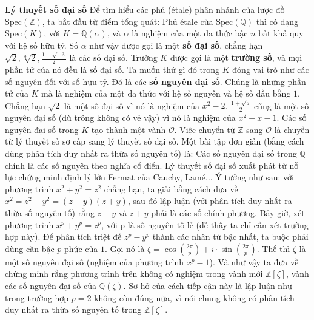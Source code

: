\begin{multicols}{2}
	\vskip 0.1cm
	\textbf{\color{duongvaotoanhoc}Lý thuyết số đại số}
	\vskip 0.1cm
	Để tìm hiểu các phủ (étale) phân nhánh của lược đồ $\text{Spec}(\mathbb{Z})$, ta bắt đầu từ điểm tổng quát: Phủ étale của $\text{Spec}(\mathbb{Q})$ thì có dạng $\text{Spec}(K)$, với $K = \mathbb{Q}(\alpha)$, và $\alpha$ là nghiệm của một đa thức bậc $n$ bất khả quy với hệ số hữu tỷ. Số $\alpha$ như vậy được gọi là một {\bf\color{duongvaotoanhoc} số đại số}, chẳng hạn $\sqrt{2}, \sqrt[3]{2}, \frac{1 + \sqrt{-3}}{2}$ là các số đại số. Trường $K$ được gọi là một {\bf\color{duongvaotoanhoc} trường số}, và mọi phần tử của nó đều là số đại số. Ta muốn thứ gì đó trong $K$ đóng vai trò như các số nguyên đối với số hữu tỷ. Đó là các {\bf\color{duongvaotoanhoc} số nguyên đại số}. Chúng là những phần tử của $K$ mà là nghiệm của một đa thức với hệ số nguyên và hệ số đầu bằng $1$. Chẳng hạn $\sqrt{2}$ là một số đại số vì nó là nghiệm của $x^2 - 2$. $\frac{1 + \sqrt{5}}{2}$ cũng là một số nguyên đại số (dù trông không có vẻ vậy) vì nó là nghiệm của $x^2-x-1$. Các số nguyên đại số trong $K$ tạo thành một vành $\mathcal{O}$. Việc chuyển từ $\mathbb{Z}$ sang $\mathcal{O}$ là chuyển từ lý thuyết số sơ cấp sang lý thuyết số đại số. Một bài tập đơn giản (bằng cách dùng phân tích duy nhất ra thừa số nguyên tố) là: Các số nguyên đại số trong $\mathbb{Q}$ chính là các số nguyên theo nghĩa cổ điển.
	\vskip 0.1cm
	Lý thuyết số đại số xuất phát từ nỗ lực chứng minh định lý lớn Fermat của Cauchy, Lamé... Ý tưởng như sau: với phương trình $x^2 + y^2 = z^2$ chẳng hạn, ta giải bằng cách đưa về $x^2=z^2-y^2=(z-y)(z+y)$, sau đó lập luận (với phân tích duy nhất ra thừa số nguyên tố) rằng $z-y$ và $z+y$ phải là các số chính phương. Bây giờ, xét phương trình $x^p+y^p=z^p$, với p là số nguyên tố lẻ (dễ thấy ta chỉ cần xét trường hợp này). Để phân tích triệt để $z^p-y^p$ thành các nhân tử bậc nhất, ta buộc phải dùng căn bậc $p$ phức của $1$. Gọi nó là $\zeta = \cos(\frac{2\pi}{p})+i \cdot \sin(\frac{2\pi}{p})$. Thế thì $\zeta$ là một số nguyên đại số (nghiệm của phương trình $x^p - 1$). Và như vậy ta đưa về chứng minh rằng phương trình trên không có nghiệm trong vành mới $\mathbb{Z}[\zeta]$, vành các số nguyên đại số của $\mathbb{Q}(\zeta)$. Sơ hở của cách tiếp cận này là lập luận như trong trường hợp $p=2$ không còn đúng nữa, vì nói chung không có phân tích duy nhất ra thừa số nguyên tố trong $\mathbb{Z}[\zeta]$.
	\vskip 0.1cm

\end{multicols}
